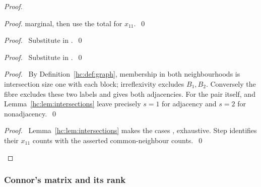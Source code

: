 \begin{mergedproofsection}
\begin{proof}
\begin{proof}
  marginal, then use the total for $x_{11}$.~\qed\end{proof}
 \begin{proof}\pf\ Substitute  in .~\qed\end{proof}
 \begin{proof}\pf\ Substitute  in .~\qed\end{proof}
 \begin{proof}\pf\ By Definition~\ref{hc:def:graph}, membership
  in both neighbourhoods is intersection size one with each block;
  irreflexivity excludes $B_1,B_2$. Conversely the fibre excludes
  these two labels and gives both adjacencies. For the pair itself,
   and Lemma~\ref{hc:lem:intersections} leave precisely
  $s=1$ for adjacency and $s=2$ for nonadjacency.~\qed\end{proof}
 \qedstep
 \begin{proof}\pf\ Lemma~\ref{hc:lem:intersections} makes the cases
  ,  exhaustive.
  Step  identifies their $x_{11}$
  counts with the asserted common-neighbour counts.~\qed\end{proof}
\end{proof}

\subsubsection{Connor's matrix and its rank}


\end{mergedproofsection}
